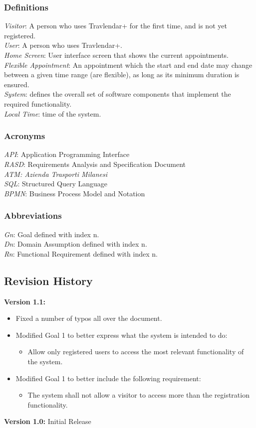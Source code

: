 \documentclass[12pt]{article}
\begin{document}
\subsubsection{Definitions}
\textit{Visitor}: A person who uses Travlendar+ for the first time, and is not yet registered.\\
\textit{User}: A person who uses Travlendar+.\\
\textit{Home Screen}: User interface screen that shows the current appointments.\\
\textit{Flexible Appointment}: An appointment which the start and end date may change between a given time range (are flexible), as long as its minimum duration is ensured.\\
\textit{System}: defines the overall set of software components that implement the required functionality.\\
\textit{Local Time}: time of the system.
\subsubsection{Acronyms}
\textit{API}: Application Programming Interface\\
\textit{RASD}: Requirements Analysis and Specification Document\\
\textit{ATM: Azienda Trasporti Milanesi}\\
\textit{SQL}: Structured Query Language\\
\textit{BPMN}: Business Process Model and Notation
\subsubsection{Abbreviations}
\textit{Gn}: Goal defined with index n.\\
\textit{Dn}: Domain Assumption defined with index n.\\
\textit{Rn}: Functional Requirement defined with index n.


\subsection{Revision History}
\textbf{Version 1.1:} 
\begin{itemize}
    \item Fixed a number of typos all over the document.
    \item Modified Goal 1 to better express what the system is intended to do: 
        \begin{itemize}
            \item Allow only registered users to access the most relevant functionality of the system.
        \end{itemize}
    \item Modified Goal 1 to better include the following requirement:
        \begin{itemize}
            \item The system shall not allow a visitor to access more than the registration functionality.
        \end{itemize}
\end{itemize}
\textbf{Version 1.0:} Initial Release
\end{document}
